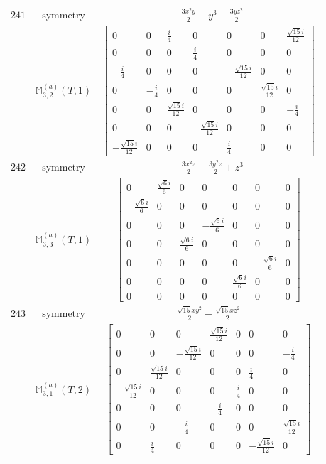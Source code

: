 \documentclass[fleqn,8pt,landscape]{jsarticle}
\begin{document}
\begin{longtable}{ccc}
$ 241 $ & $ \text{symmetry} $ & $ - \frac{3 x^{2} y}{2} + y^{3} - \frac{3 y z^{2}}{2} $ \\
$  $ & $ \mathbb{M}_{3,2}^{(a)}(T,1) $ & $ \begin{bmatrix} 0 & 0 & \frac{i}{4} & 0 & 0 & 0 & \frac{\sqrt{15} i}{12} \\ 0 & 0 & 0 & \frac{i}{4} & 0 & 0 & 0 \\ - \frac{i}{4} & 0 & 0 & 0 & - \frac{\sqrt{15} i}{12} & 0 & 0 \\ 0 & - \frac{i}{4} & 0 & 0 & 0 & \frac{\sqrt{15} i}{12} & 0 \\ 0 & 0 & \frac{\sqrt{15} i}{12} & 0 & 0 & 0 & - \frac{i}{4} \\ 0 & 0 & 0 & - \frac{\sqrt{15} i}{12} & 0 & 0 & 0 \\ - \frac{\sqrt{15} i}{12} & 0 & 0 & 0 & \frac{i}{4} & 0 & 0 \end{bmatrix} $ \\ \hline
$ 242 $ & $ \text{symmetry} $ & $ - \frac{3 x^{2} z}{2} - \frac{3 y^{2} z}{2} + z^{3} $ \\
$  $ & $ \mathbb{M}_{3,3}^{(a)}(T,1) $ & $ \begin{bmatrix} 0 & \frac{\sqrt{6} i}{6} & 0 & 0 & 0 & 0 & 0 \\ - \frac{\sqrt{6} i}{6} & 0 & 0 & 0 & 0 & 0 & 0 \\ 0 & 0 & 0 & - \frac{\sqrt{6} i}{6} & 0 & 0 & 0 \\ 0 & 0 & \frac{\sqrt{6} i}{6} & 0 & 0 & 0 & 0 \\ 0 & 0 & 0 & 0 & 0 & - \frac{\sqrt{6} i}{6} & 0 \\ 0 & 0 & 0 & 0 & \frac{\sqrt{6} i}{6} & 0 & 0 \\ 0 & 0 & 0 & 0 & 0 & 0 & 0 \end{bmatrix} $ \\ \hline
$ 243 $ & $ \text{symmetry} $ & $ \frac{\sqrt{15} x y^{2}}{2} - \frac{\sqrt{15} x z^{2}}{2} $ \\
$  $ & $ \mathbb{M}_{3,1}^{(a)}(T,2) $ & $ \begin{bmatrix} 0 & 0 & 0 & \frac{\sqrt{15} i}{12} & 0 & 0 & 0 \\ 0 & 0 & - \frac{\sqrt{15} i}{12} & 0 & 0 & 0 & - \frac{i}{4} \\ 0 & \frac{\sqrt{15} i}{12} & 0 & 0 & 0 & \frac{i}{4} & 0 \\ - \frac{\sqrt{15} i}{12} & 0 & 0 & 0 & \frac{i}{4} & 0 & 0 \\ 0 & 0 & 0 & - \frac{i}{4} & 0 & 0 & 0 \\ 0 & 0 & - \frac{i}{4} & 0 & 0 & 0 & \frac{\sqrt{15} i}{12} \\ 0 & \frac{i}{4} & 0 & 0 & 0 & - \frac{\sqrt{15} i}{12} & 0 \end{bmatrix} $ \\ \hline

\end{longtable}
\end{document}
